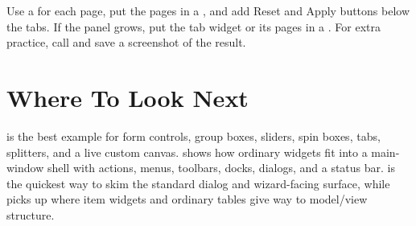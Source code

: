 Use a  for each page, put the pages in a , and add Reset and Apply buttons below the tabs. If the panel grows, put the tab widget or its pages in a . For extra practice, call  and save a screenshot of the result.

\section{Where To Look Next}

 is the best example for form controls, group boxes, sliders, spin boxes, tabs, splitters, and a live custom canvas.  shows how ordinary widgets fit into a main-window shell with actions, menus, toolbars, docks, dialogs, and a status bar.  is the quickest way to skim the standard dialog and wizard-facing surface, while  picks up where item widgets and ordinary tables give way to model/view structure.
